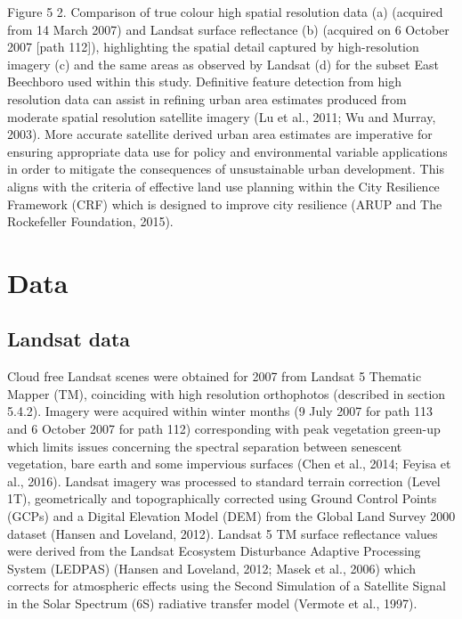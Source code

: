\documentclass[]{book}
\begin{document}
Figure 5 2. Comparison of true colour high spatial resolution data (a)
(acquired from 14 March 2007) and Landsat surface reflectance (b)
(acquired on 6 October 2007 {[}path 112{]}), highlighting the spatial
detail captured by high-resolution imagery (c) and the same areas as
observed by Landsat (d) for the subset East Beechboro used within this
study. Definitive feature detection from high resolution data can assist
in refining urban area estimates produced from moderate spatial
resolution satellite imagery (Lu et al., 2011; Wu and Murray, 2003).
More accurate satellite derived urban area estimates are imperative for
ensuring appropriate data use for policy and environmental variable
applications in order to mitigate the consequences of unsustainable
urban development. This aligns with the criteria of effective land use
planning within the City Resilience Framework (CRF) which is designed to
improve city resilience (ARUP and The Rockefeller Foundation, 2015).

\hypertarget{data}{\section{Data}\label{data}}

\subsection{Landsat data}\label{landsat-data}

Cloud free Landsat scenes were obtained for 2007 from Landsat 5 Thematic
Mapper (TM), coinciding with high resolution orthophotos (described in
section 5.4.2). Imagery were acquired within winter months (9 July 2007
for path 113 and 6 October 2007 for path 112) corresponding with peak
vegetation green-up which limits issues concerning the spectral
separation between senescent vegetation, bare earth and some impervious
surfaces (Chen et al., 2014; Feyisa et al., 2016). Landsat imagery was
processed to standard terrain correction (Level 1T), geometrically and
topographically corrected using Ground Control Points (GCPs) and a
Digital Elevation Model (DEM) from the Global Land Survey 2000 dataset
(Hansen and Loveland, 2012). Landsat 5 TM surface reflectance values
were derived from the Landsat Ecosystem Disturbance Adaptive Processing
System (LEDPAS) (Hansen and Loveland, 2012; Masek et al., 2006) which
corrects for atmospheric effects using the Second Simulation of a
Satellite Signal in the Solar Spectrum (6S) radiative transfer model
(Vermote et al., 1997).
\end{document}
